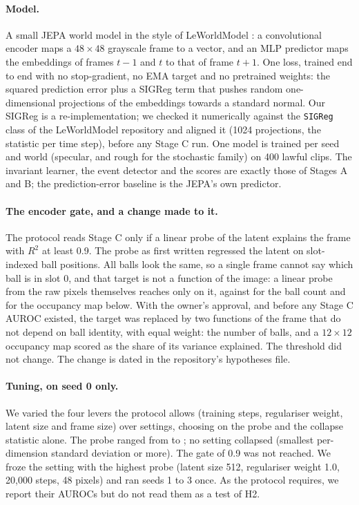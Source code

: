 \documentclass[11pt]{article}
\begin{document}
\paragraph{Model.} A small JEPA world model in the style of LeWorldModel \citep{maes2026lewm}: a
convolutional encoder maps a $48 \times 48$ grayscale frame to a vector, and an MLP predictor maps
the embeddings of frames $t-1$ and $t$ to that of frame $t+1$. One loss, trained end to end with no
stop-gradient, no EMA target and no pretrained weights: the squared prediction error plus a SIGReg
term that pushes random one-dimensional projections of the embeddings towards a standard normal. Our
SIGReg is a re-implementation; we checked it numerically against the \texttt{SIGReg} class of the
LeWorldModel repository and aligned it (1024 projections, the statistic per time step), before any
Stage C run. One model is trained per seed and world (specular, and rough for the stochastic family)
on 400 lawful clips. The invariant learner, the event detector and the scores are exactly those of
Stages A and B; the prediction-error baseline is the JEPA's own predictor.

\paragraph{The encoder gate, and a change made to it.} The protocol reads Stage C only if a linear
probe of the latent explains the frame with $R^2$ at least 0.9. The probe as first written regressed
the latent on slot-indexed ball positions. All balls look the same, so a single frame cannot say
which ball is in slot 0, and that target is not a function of the image: a linear probe from the
raw pixels themselves reaches only \DPixSlots{} on it, against \DPixCount{} for the ball count and
\DPixOcc{} for the occupancy map below. With the owner's approval,
and before any Stage C AUROC existed, the target was replaced by two functions of the frame that
do not depend on ball identity, with equal weight: the number of balls, and a $12 \times 12$
occupancy map scored as the share of its variance explained. The threshold did not change. The
change is dated in the repository's hypotheses file.

\paragraph{Tuning, on seed 0 only.} We varied the four levers the protocol allows (training steps,
regulariser weight, latent size and frame size) over \TuneN{} settings, choosing on the probe and the
collapse statistic alone. The probe ranged from \TuneProbeMin{} to \TuneProbeMax{}; no setting
collapsed (smallest per-dimension standard deviation \TuneStdMin{} or more). The gate of 0.9 was not
reached. We froze the setting with the highest probe (latent size 512, regulariser weight 1.0, 20,000
steps, 48 pixels) and ran seeds 1 to 3 once. As the protocol requires, we report their AUROCs but do
not read them as a test of H2.
\end{document}
